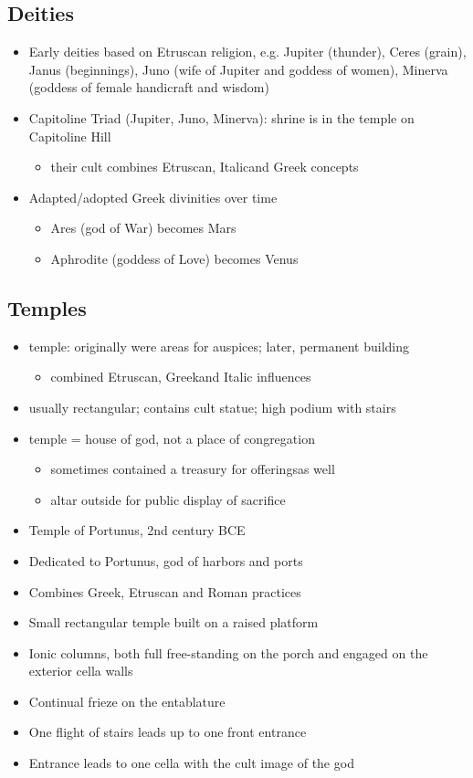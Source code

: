 \documentclass[12pt, twoside]{article}
\begin{document}
\subsection{Deities}
\begin{itemize}
\item Early deities based on Etruscan religion, e.g. Jupiter (thunder), Ceres (grain), Janus (beginnings), Juno (wife of Jupiter and goddess of women), Minerva (goddess of female handicraft and wisdom)
\item Capitoline Triad (Jupiter, Juno, Minerva): shrine is in the temple on Capitoline Hill
	\begin{itemize}
	\item their cult combines Etruscan, Italicand Greek concepts
	\end{itemize}
\item Adapted/adopted Greek divinities over time
	\begin{itemize}
	\item Ares (god of War) becomes Mars
	\item Aphrodite (goddess of Love) becomes Venus
	\end{itemize}
\end{itemize}

\subsection{Temples}
\begin{itemize}
\item temple: originally were areas for auspices; later, permanent building
	\begin{itemize}
	\item combined Etruscan, Greekand Italic influences
	\end{itemize}
\item usually rectangular; contains cult statue; high podium with stairs
\item temple = house of god, not a place of congregation
	\begin{itemize}
	\item sometimes contained a treasury for offeringsas well
	\item altar outside for public display of sacrifice
	\end{itemize}
\item Temple of Portunus,  2nd century BCE
\item Dedicated to Portunus, god of harbors and ports
\item Combines Greek, Etruscan and Roman practices
\item Small rectangular temple built on a raised platform
\item Ionic columns, both full free-standing on the porch and engaged on the exterior cella walls
\item Continual frieze on the entablature
\item One flight of stairs leads up to one front entrance
\item Entrance leads to one cella with the cult image of the god
\end{itemize}
\end{document}
